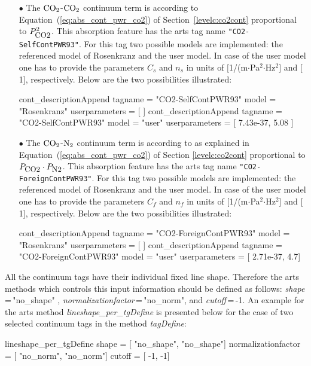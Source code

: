 \begin{itemize}
\item[$\bullet$] The \citet{pwr:93} $\mbox{CO}_2$-$\mbox{CO}_2$ continuum term is
  according to Equation~(\ref{eq:abs_cont_pwr_co2}) of
  Section~\ref{levelc:co2cont} proportional to $P_{\mbox{\rm \small CO2}}^2$. This
  absorption feature has the arts tag name {\tt "CO2-SelfContPWR93"}.
  For this tag two possible models are implemented: the referenced
  model of Rosenkranz and the user model. In case of the user model
  one has to provide the parameters $C_s$ and $n_s$ in units of
  $[$1/(m$\cdot$Pa$^2$$\cdot$Hz$^2$$]$ and $[$1$]$, respectively.
  Below are the two possibilities illustrated:
\begin{code}
cont_descriptionAppend{
    tagname        = "CO2-SelfContPWR93"
    model          = "Rosenkranz"
    userparameters = [ ]
}
cont_descriptionAppend{
    tagname        = "CO2-SelfContPWR93"
    model          = "user"
    userparameters = [ 7.43e-37, 5.08 ]
}
\end{code}

  
\item[$\bullet$] The \citet{pwr:93} $\mbox{CO}_2$-$\mbox{N}_2$ continuum term is
  according to as explained in Equation~(\ref{eq:abs_cont_pwr_co2}) of
  Section \ref{levelc:co2cont} proportional to $P_{\mbox{\rm \small CO2}} \cdot P_{\mbox{\rm \small N2}}$.
  This absorption feature has the arts tag name 
  {\tt"CO2-ForeignContPWR93"}. For this tag two possible models are
  implemented: the referenced model of Rosenkranz and the user model.
  In case of the user model one has to provide the parameters $C_f$
  and $n_f$ in units of $[$1/(m$\cdot$Pa$^2$$\cdot$Hz$^2$$]$ and
  $[$1$]$, respectively.  Below are the two possibilities illustrated:
\begin{code}
cont_descriptionAppend{
    tagname        = "CO2-ForeignContPWR93"
    model          = "Rosenkranz"
    userparameters = [ ]
}
cont_descriptionAppend{
    tagname        = "CO2-ForeignContPWR93"
    model          = "user"
    userparameters = [ 2.71e-37, 4.7]
}
\end{code}
\end{itemize}

All the continuum tags have their individual fixed line shape. 
Therefore the arts methods which controls this input information
should be defined as follows:  {\it shape}\,=\,"no\_shape" , 
{\it normalizationfactor}\,=\,"no\_norm", and {\it cutoff}\,=\,-1. An 
example for the arts method {\it lineshape\_per\_tgDefine} is presented 
below for the case of two selected continuum tags in the method 
{\it tagDefine}:
\begin{code}
lineshape_per_tgDefine{
        shape               = [ "no_shape", 
                                "no_shape"]
        normalizationfactor = [ "no_norm", 
                                "no_norm"]
        cutoff              = [ -1,
                                -1]
}
\end{code}

